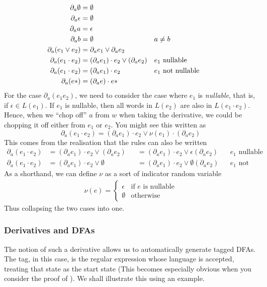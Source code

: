 \[\begin{aligned}
\partial_a \emptyset & = \emptyset&&\\ 
\partial_a \epsilon & = \emptyset&&\\
\partial_a a & = \epsilon&&\\
\partial_a b & = \emptyset && a \neq b&&\\
\partial_a (e_1 \lor e_2) & = \partial_a e_1 \lor \partial_a e_2&&\\
\partial_a (e_1 \cdot e_2) & = (\partial_a e_1) \cdot e_2 \lor (\partial_a e_2) && e_1 \text{ nullable}&&\\
\partial_a (e_1 \cdot e_2) & = (\partial_a e_1) \cdot e_2 && e_1 \text{ not nullable}&&\\
\partial_a (e\*) & = (\partial_a e) \cdot e\*&&
\end{aligned}\]
For the case $\partial_a (e_1 e_2)$, we need to consider the case where $e_1$ is \emph{nullable}, that is, if $\epsilon \in L(e_1)$. If $e_1$ is nullable, then all words in $L(e_2)$ are also in $L(e_1 \cdot e_2)$. Hence, when we ``chop off'' $a$ from $w$ when taking the derivative, we could be chopping it off either from $e_1$ or $e_2$. You might see this written as 
\[ \partial_a (e_1 \cdot e_2) = (\partial_a e_1) \cdot e_2 \lor \nu(e_1) \cdot (\partial_a e_2)  \]
This comes from the realisation that the rules can also be written 
\begin{align*}
\partial_a (e_1 \cdot e_2) & = (\partial_a e_1) \cdot e_2 \lor (\partial_a e_2) &&= (\partial_a e_1) \cdot e_2 \lor \epsilon(\partial_a e_2) && e_1 \text{ nullable}&&\\
\partial_a (e_1 \cdot e_2) &= (\partial_a e_1) \cdot e_2 \lor \emptyset &&= (\partial_a e_1) \cdot e_2 \lor \emptyset(\partial_a e_2) && e_1 \text{ not nullable}&&
\end{align*}
As a shorthand, we can define $\nu$ as a sort of indicator random variable
\begin{align*}
    \nu(e) = \begin{cases} 
      \epsilon & \text{if $e$ is nullable} \\
      \emptyset & \text{otherwise}
   \end{cases}
\end{align*}
Thus collapsing the two cases into one.

\subsubsection{Derivatives and DFAs}
The notion of such a derivative allows us to automatically generate tagged DFAs. The tag, in this case, is the regular expression whose language is accepted, treating that state as the start state (This becomes especially obvious when you consider the proof of ). We shall illustrate this using an example. 

